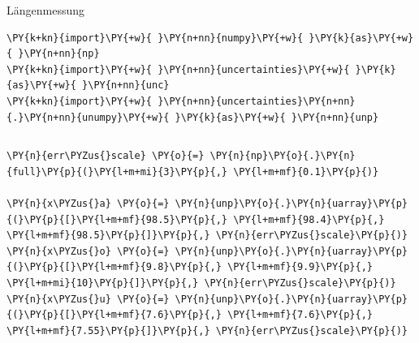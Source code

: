 
    
    Längenmessung

    \begin{tcolorbox}[breakable, size=fbox, boxrule=1pt, pad at break*=1mm,colback=cellbackground, colframe=cellborder]
\begin{Verbatim}[commandchars=\\\{\}]
\PY{k+kn}{import}\PY{+w}{ }\PY{n+nn}{numpy}\PY{+w}{ }\PY{k}{as}\PY{+w}{ }\PY{n+nn}{np}
\PY{k+kn}{import}\PY{+w}{ }\PY{n+nn}{uncertainties}\PY{+w}{ }\PY{k}{as}\PY{+w}{ }\PY{n+nn}{unc}
\PY{k+kn}{import}\PY{+w}{ }\PY{n+nn}{uncertainties}\PY{n+nn}{.}\PY{n+nn}{unumpy}\PY{+w}{ }\PY{k}{as}\PY{+w}{ }\PY{n+nn}{unp}
\end{Verbatim}
\end{tcolorbox}

    \begin{tcolorbox}[breakable, size=fbox, boxrule=1pt, pad at break*=1mm,colback=cellbackground, colframe=cellborder]
\begin{Verbatim}[commandchars=\\\{\}]

\end{Verbatim}
\end{tcolorbox}

    \begin{tcolorbox}[breakable, size=fbox, boxrule=1pt, pad at break*=1mm,colback=cellbackground, colframe=cellborder]
\begin{Verbatim}[commandchars=\\\{\}]
\PY{n}{err\PYZus{}scale} \PY{o}{=} \PY{n}{np}\PY{o}{.}\PY{n}{full}\PY{p}{(}\PY{l+m+mi}{3}\PY{p}{,} \PY{l+m+mf}{0.1}\PY{p}{)}

\PY{n}{x\PYZus{}a} \PY{o}{=} \PY{n}{unp}\PY{o}{.}\PY{n}{uarray}\PY{p}{(}\PY{p}{[}\PY{l+m+mf}{98.5}\PY{p}{,} \PY{l+m+mf}{98.4}\PY{p}{,} \PY{l+m+mf}{98.5}\PY{p}{]}\PY{p}{,} \PY{n}{err\PYZus{}scale}\PY{p}{)}
\PY{n}{x\PYZus{}o} \PY{o}{=} \PY{n}{unp}\PY{o}{.}\PY{n}{uarray}\PY{p}{(}\PY{p}{[}\PY{l+m+mf}{9.8}\PY{p}{,} \PY{l+m+mf}{9.9}\PY{p}{,} \PY{l+m+mi}{10}\PY{p}{]}\PY{p}{,} \PY{n}{err\PYZus{}scale}\PY{p}{)}
\PY{n}{x\PYZus{}u} \PY{o}{=} \PY{n}{unp}\PY{o}{.}\PY{n}{uarray}\PY{p}{(}\PY{p}{[}\PY{l+m+mf}{7.6}\PY{p}{,} \PY{l+m+mf}{7.6}\PY{p}{,} \PY{l+m+mf}{7.55}\PY{p}{]}\PY{p}{,} \PY{n}{err\PYZus{}scale}\PY{p}{)}
\end{Verbatim}
\end{tcolorbox}

